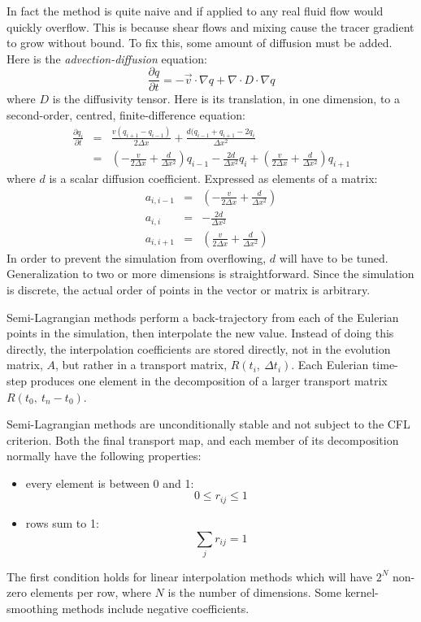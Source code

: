 \documentclass[12pt]{article}
\begin{document}
In fact the method is quite naive and if applied to any real fluid flow would 
quickly overflow.
This is because shear flows and mixing cause the tracer gradient to grow without bound.
To fix this, some amount of diffusion must be added.  Here is the 
{\it advection-diffusion} equation:
\begin{equation}
\frac{\partial q}{\partial t} = - \vec v \cdot \nabla q + \nabla \cdot D \cdot \nabla q
\end{equation}
where $D$ is the diffusivity tensor.
Here is its translation, in one dimension, to a second-order, centred,
finite-difference equation:
\begin{eqnarray}
\frac{\partial q_i}{\partial t} & = & \frac{v(q_{i+1} - q_{i-1})}{2 \Delta x} +
	\frac{d (q_{i-1} + q_{i+1} - 2 q_i}{\Delta x^2} \\
& = & \left (- \frac{v}{2 \Delta x} + \frac{d}{\Delta x^2} \right ) q_{i-1} -
	\frac{2 d}{\Delta x^2} q_i + 
	\left (\frac{v}{2 \Delta x} + \frac{d}{\Delta x^2} \right ) q_{i+1}
\end{eqnarray}
where $d$ is a scalar diffusion coefficient.
Expressed as elements of a matrix:
\begin{eqnarray}
a_{i,i-1} & = & \left (- \frac{v}{2 \Delta x} + \frac{d}{\Delta x^2} \right ) \\
a_{i,i} & = & -\frac{2 d}{\Delta x^2} \\
a_{i,i+1} & = & \left (\frac{v}{2 \Delta x} + \frac{d}{\Delta x^2} \right )
\end{eqnarray}
In order to prevent the simulation from overflowing, $d$ will have to be tuned.
Generalization to two or more dimensions is straightforward.
Since the simulation is discrete, the actual order of points in the
vector or matrix is arbitrary.

Semi-Lagrangian methods perform a back-trajectory from each of the Eulerian
points in the simulation, then interpolate the new value.  Instead of doing
this directly, the interpolation coefficients are stored directly, not in
the evolution matrix, $A$, but rather in a transport matrix, $R(t_i,~\Delta t_i)$.
Each Eulerian time-step produces one element in the decomposition of a
larger transport matrix $R(t_0,~t_n-t_0)$.

Semi-Lagrangian methods are unconditionally stable and not subject to the
CFL criterion.
Both the final transport map, and each member of its decomposition normally have
the following properties:
\begin{itemize}
\item every element is between 0 and 1:
\begin{equation}
0 \le r_{ij} \le 1
\label{element_on_unit_interval}
\end{equation}
\item rows sum to 1:
\begin{equation}
\sum_j r_{ij} = 1
\end{equation}
\end{itemize}
The first condition holds for linear interpolation methods which will have
$2^N$ non-zero elements per row, where $N$ is the number of dimensions. 
Some kernel-smoothing methods include negative coefficients.
\end{document}
